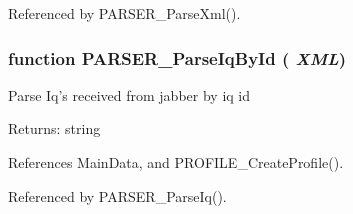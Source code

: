 Referenced by PARSER\_\-ParseXml().
\subsubsection{\setlength{\rightskip}{0pt plus 5cm}function PARSER\_\-ParseIqById ( {\em XML})}\label{parser__iq_8js_f710f19fad9238f2a58badaa67831c5f}


Parse Iq's received from jabber by iq id

\begin{Desc}
\item[Returns:]string \end{Desc}


References MainData, and PROFILE\_\-CreateProfile().

Referenced by PARSER\_\-ParseIq().